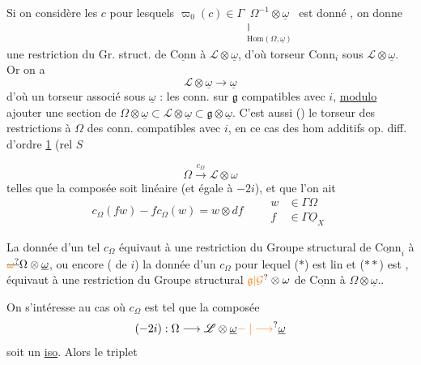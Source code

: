 Si on considère les $c$ pour lesquels $\varpi_0(c)\in\Gamma\underset{\substack{\Vert\\\mathrm{Hom}(\Omega,\underline\omega)}}{\Omega^{-1}\otimes\underline\omega}$ est donné , on donne une restriction du Gr. struct. de $\underline{\mathrm{Conn}}$ à $\mathscr L\otimes\underline\omega$, d'où torseur $\mathrm{Conn}_i$ sous $\mathscr L\otimes\underline\omega$. Or on a
\[ \mathscr L\otimes\underline\omega\longrightarrow\underline\omega \]
d'où un torseur associé sous $\underline\omega$ : les conn. sur $\mathfrak g$ compatibles avec $i$, \uline{modulo} ajouter une section de $\Omega\otimes\underline\omega\subset\mathscr L\otimes\underline\omega\subset\mathfrak g\otimes\underline\omega$. C'est aussi () le torseur des restrictions à $\Omega$ des conn. compatibles avec $i$, en ce cas des hom additifs op. diff. d'ordre \uline{1} (rel $S$

\[ \Omega\xrightarrow{c_\Omega}\mathscr L\otimes\omega \]
telles que la composée \deleted{$\unsure{\Omega\to\Omega\otimes\omega}$}  soit linéaire (et égale à $-2i$), et que l'on ait
\[ c_\Omega(fw)-fc_\Omega(w)=w\otimes df\qquad \begin{aligned}w&\in\Gamma\Omega\\f&\in\Gamma\underline O_X\end{aligned} \]




La donnée d'un tel $c_\Omega$ équivaut à une restriction du Groupe structural de $\underline{\mathrm{Conn}}_i$  à $\deleted{\unsure{\omega}}\Omega\otimes\underline\omega$, ou encore ( de $i$) la donnée d'un $c_\Omega$ pour lequel ($\ast$) est lin et ($\ast\ast$) est , équivaut à une restriction du Groupe structural $\unsure{\mathfrak g|\mathcal G}\otimes\omega$ de $\underline{\mathrm{Conn}}$ à $\Omega\otimes\underline\omega$..

On s'intéresse au cas où  $c_\Omega$ est tel que la composée
\[ (-2i):\Omega\longrightarrow\mathscr L\otimes\underline\omega\unsure{\relbar|\longrightarrow}\underline\omega \]
soit un \uline{iso}.  Alors  le triplet

